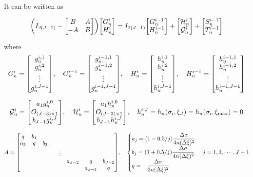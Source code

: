 \documentclass{article}
\begin{document}
It can be written as

\begin{align}
	\qty(I_{2(J-1)} - \mqty[B&A\\ -A&B] ) \mqty[G_n^i\\H_n^i] = I_{2(J-1)} \mqty[G_n^{i-1}\\ H_n^{i-1}] 
+\mqty[\mathcal{H}_n^i\\ \mathcal{G}_n^i]
+\mqty[S_n^{i-1}\\ T_n^{i-1}]
\end{align}

where
\begin{align}
	G_n^i = \mqty[g_n^{i,1}\\ g_n^{i,2} \\ \vdots \\ g_n^{i,J-1}]\qc 
	G_n^{i-1} = \mqty[g_n^{i-1,1}\\ g_n^{i-1,2} \\ \vdots \\ g_n^{i-1,J-1}]\qc 
	H_n^i = \mqty[h_n^{i,1}\\ h_n^{i,2} \\ \vdots \\ h_n^{i,J-1}]\qc 
	H_n^{i-1} = \mqty[h_n^{i-1,1}\\ h_n^{i-1,2} \\ \vdots \\ h_n^{i-1,J-1}]
\end{align}

\begin{align}
	\mathcal{G}_n^i = \mqty[a_1 g_n^{i,0}\\ O_{(J-3)\times 1} \\ b_{J-1} g_n^{i,J}]\qc
	\mathcal{H}_n^i = \mqty[a_1 h_n^{i,0}\\ O_{(J-3)\times 1} \\ b_{J-1} h_n^{i,J}]\qc 
	h_n^{i,J} = h_n(\sigma_i, \xi_J) = h_n(\sigma_i,\xi\st{max}) = 0
\end{align}

\begin{align}
	A = \mqty[q & b_1 \\ a_2 & q & b_2 \\ & & & & \vdots \\ & & & & & a_{J-2}& q & b_{J-2}\\ &&&&&&a_{J-1}&q]\qc
	\begin{cases}
		a_j = (1-0.5/j)\dfrac{\Delta \sigma}{4n(\Delta \xi)^2} \\
		b_j = (1+0.5/j)\dfrac{\Delta \sigma}{4n(\Delta \xi)^2} \\
		q = -\dfrac{\Delta \sigma }{2n(\Delta \xi)^2}
	\end{cases} j=1,2,\cdots, J-1
\end{align}
\end{document}
